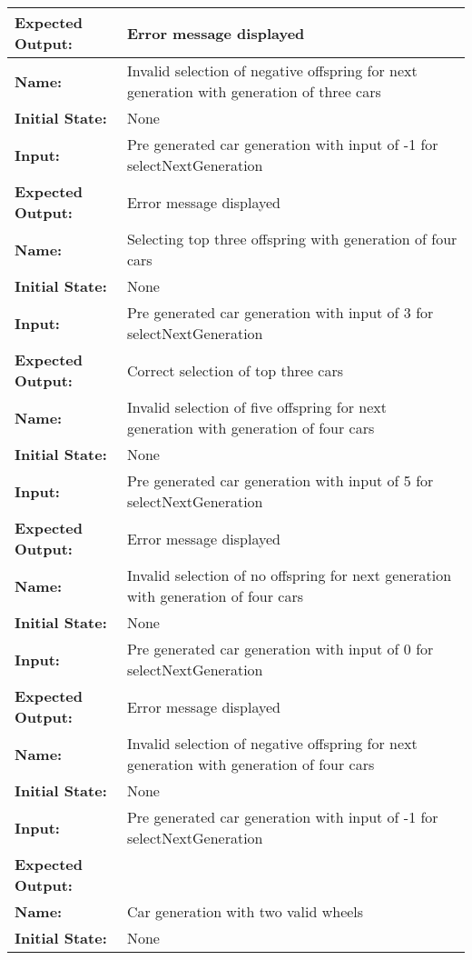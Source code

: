 \documentclass[12pt, titlepage]{article}
\begin{document}
\begin{center}
\begin{longtable}{ l | p{10cm} }
\textbf{Expected Output:} & Error message displayed\\[0.6em]
\hline
\rule{0pt}{1.5em}\textbf{Name:} & Invalid selection of negative offspring for next generation with generation of three cars\\
\textbf{Initial State:} & None\\
\textbf{Input:} & Pre generated car generation with input of -1 for selectNextGeneration\\
\textbf{Expected Output:} & Error message displayed\\[0.6em]
\hline
\rule{0pt}{1.5em}\textbf{Name:} & Selecting top three offspring with generation of four cars\\
\textbf{Initial State:} & None\\
\textbf{Input:} & Pre generated car generation with input of 3 for selectNextGeneration\\
\textbf{Expected Output:} & Correct selection of top three cars\\[0.6em]
\hline
\rule{0pt}{1.5em}\textbf{Name:} & Invalid selection of five offspring for next generation with generation of four cars\\
\textbf{Initial State:} & None\\
\textbf{Input:} & Pre generated car generation with input of 5 for selectNextGeneration\\
\textbf{Expected Output:} & Error message displayed\\[0.6em]
\hline
\rule{0pt}{1.5em}\textbf{Name:} & Invalid selection of no offspring for next generation with generation of four cars\\
\textbf{Initial State:} & None\\
\textbf{Input:} & Pre generated car generation with input of 0 for selectNextGeneration\\
\textbf{Expected Output:} & Error message displayed\\[0.6em]
\hline
\rule{0pt}{1.5em}\textbf{Name:} & Invalid selection of negative offspring for next generation with generation of four cars\\
\textbf{Initial State:} & None\\
\textbf{Input:} & Pre generated car generation with input of -1 for selectNextGeneration\\
\textbf{Expected Output:} & \\[0.6em]
\hline
\rule{0pt}{1.5em}\textbf{Name:} & Car generation with two valid wheels\\
\textbf{Initial State:} & None\\

\end{longtable}
\end{center}
\end{document}
